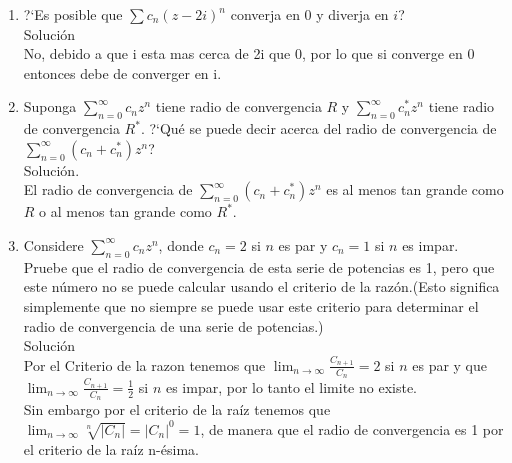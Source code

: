 \begin{enumerate}
\item ?`Es posible que $\sum c_{n}(z-2i)^n$ converja en 0 y diverja en $i$?\\
Soluci\'on\\
No, debido a que i esta mas cerca de 2i que 0, por lo que si converge en 0 entonces debe de converger en i.
\item Suponga $\sum\limits_{n=0}^\infty c_{n}z^n$ tiene radio de convergencia $R$ y $\sum\limits_{n=0}^\infty c_{n}^*z^n$ tiene radio de convergencia $R^*$. ?`Qu\'e se puede decir acerca del radio de convergencia de $\sum\limits_{n=0}^\infty(c_{n}+c_{n}^*)z^n$? \\
Soluci\'on.\\
El radio de convergencia de $\sum\limits_{n=0}^\infty(c_{n}+c_{n}^*)z^n$ es al menos tan grande como $R$ o al menos tan grande como $R^*$.
\item Considere $\sum\limits_{n=0}^\infty c_{n}z^n$, donde $c_{n}=2$  si $n$ es par y $c_{n}=1$ si $n$ es impar. Pruebe que el radio de convergencia de esta serie de potencias es 1, pero que este n\'umero no se puede calcular usando el criterio de la raz\'on.(Esto significa simplemente que no siempre se puede usar este criterio para determinar el radio de convergencia de una serie de potencias.)\\
Soluci\'on\\
Por el Criterio de la razon tenemos que  $\lim_{n \to \infty}\frac{C_{n+1}}{C_n} = 2$ si $n$ es par y que $\lim_{n \to \infty}\frac{C_{n+1}}{C_n}=\frac{1}{2}$ si $n$ es impar, por lo tanto el limite no existe.\\
Sin embargo por el criterio de la ra\'iz tenemos que $\lim_{n \to \infty} \sqrt[n]{|C_n|}=|C_n|^0= 1$, de manera que el radio de convergencia es 1 por el criterio de la ra\'iz n-\'esima.
\end{enumerate}